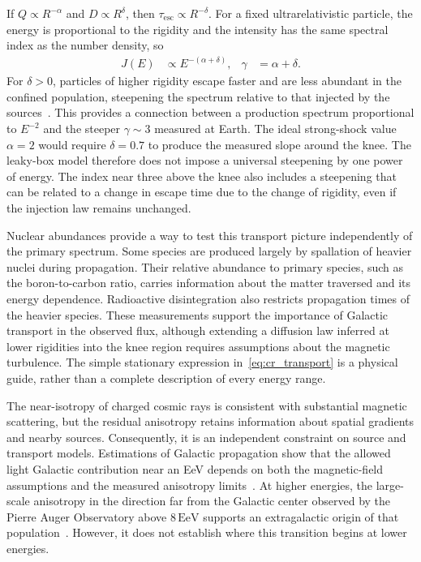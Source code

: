 \documentclass[main.tex]{subfiles}
\begin{document}
If $Q\propto R^{-\alpha}$ and $D\propto R^{\delta}$, then $\tau_{\mathrm{esc}}\propto R^{-\delta}$.
For a fixed ultrarelativistic particle, the energy is proportional to the rigidity and the intensity has the same spectral index as the number density, so
\begin{align}
    J(E)&\propto E^{-(\alpha+\delta)}, &
    \gamma&=\alpha+\delta .
    \label{eq:cr_propagated_index}
\end{align}
For $\delta>0$, particles of higher rigidity escape faster and are less abundant in the confined population, steepening the spectrum relative to that injected by the sources~\cite{PDG:2025:CosmicRays}.
This provides a connection between a production spectrum proportional to $E^{-2}$ and the steeper $\gamma\sim3$ measured at Earth.
The ideal strong-shock value $\alpha=2$ would require $\delta=0.7$ to produce the measured slope around the knee.
The leaky-box model therefore does not impose a universal steepening by one power of energy. %
The index near three above the knee also includes a steepening that can be related to a change in escape time due to the change of rigidity, even if the injection law remains unchanged.

Nuclear abundances provide a way to test this transport picture independently of the primary spectrum.
Some species are produced largely by spallation of heavier nuclei during propagation.
Their relative abundance to primary species, such as the boron-to-carbon ratio, carries information about the matter traversed and its energy dependence.
Radioactive disintegration also restricts propagation times of the heavier species.
These measurements support the importance of Galactic transport in the observed flux, although extending a diffusion law inferred at lower rigidities into the knee region requires assumptions about the magnetic turbulence.
The simple stationary expression in~\cref{eq:cr_transport} is a physical guide, rather than a complete description of every energy range.

The near-isotropy of charged cosmic rays is consistent with substantial magnetic scattering, but the residual anisotropy retains information about spatial gradients and nearby sources.
Consequently, it is an independent constraint on source and transport models.
Estimations of Galactic propagation show that the allowed light Galactic contribution near an EeV depends on both the magnetic-field assumptions and the measured anisotropy limits~\cite{Giacinti:2012:AnisotropyTransition}. %
At higher energies, the large-scale anisotropy in the direction far from the Galactic center observed by the Pierre Auger Observatory above $8\,\mathrm{EeV}$ supports an extragalactic origin of that population~\cite{PierreAuger:2017:LargeScaleAnisotropy}.
However, it does not establish where this transition begins at lower energies.
\end{document}
